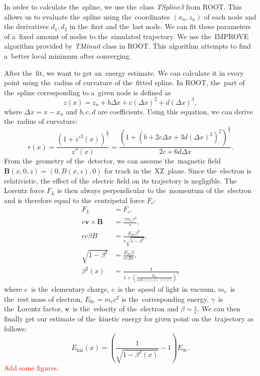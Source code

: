 		In order to calculate the~spline, we use the~class \textit{TSpline3} from ROOT. This allows us to evaluate the~spline using the~coordinates $(x_n,z_n)$ of each node and the derivatives $d_1,d_2$ in the~first and the~last node. We can fit these parameters of a~fixed amount of nodes to the~simulated trajectory. We use the~IMPROVE algorithm provided by \textit{TMinuit} class in ROOT. This algorithm attempts to find a~better local minimum after converging.
		
		After the~fit, we want to get an~energy estimate. We can calculate it in every point using the~radius of curvature of the~fitted spline. In ROOT, the~part of the~spline corresponding to a~given node is defined as
			\begin{equation}
				z(x) = z_n + b \Delta x+c(\Delta x)^2+d(\Delta x)^3,
			\end{equation}
		where $\Delta x = x-x_n$ and $b,c,d$ are coefficients. Using this equation, we can derive the~radius of curvature:
			\begin{equation}
				r(x) = \frac{\left(1+z'^2(x)\right)^\frac{3}{2}}{z''(x)} = \frac{\left(1+\left(b+2c\Delta x+3d(\Delta x)^2\right)^2\right)^\frac{3}{2}}{2c+6d\Delta x}.
			\end{equation}
		From the~geometry of the~detector, we can assume the~magnetic field $\bm{B}(x,0,z) = (0,B(x,z),0)$ for track in the~XZ~plane. Since the~electron is relativistic, the effect of the~electric field on its trajectory is negligible. The Lorentz force $F_L$ is then always perpendicular to the~momentum of the~electron and is therefore equal to the~centripetal force $F_c$:
			\begin{align}
				F_L &= F_c,\\
				e\bm{v}\times\bm{B} &= \frac{\gamma m_e v^2}{r},\\
				e c\beta B &= \frac{E_{0e} \beta^2}{r\sqrt{1-\beta^2}},\\
				\sqrt{1-\beta^2} &= \frac{E_{0e} \beta}{ecBr},\\
				\beta^2(x) &= \frac{1}{1+\left(\frac{E_{0e}}{ecB(x,z(x))r(x)}\right)^2}
			\end{align}
		where $e$~is the~elementary charge, $c$~is the~speed of light in vacuum, $m_e$~is the~rest mass of electron, $E_{0e} = m_e c^2$ is the~corresponding energy, $\gamma$~is the~Lorentz factor, $\bm{v}$~is the~velocity of the~electron and $\beta = \frac{v}{c}$. We can then finally get our estimate of the~kinetic energy for given point on the~trajectory as follows:
			\begin{equation}
				E_\text{kin}(x) = \left(\frac{1}{\sqrt{1-\beta^2(x)}}-1\right)E_{0e}.
			\end{equation}
		\textcolor{red}{Add some figures.}
		
